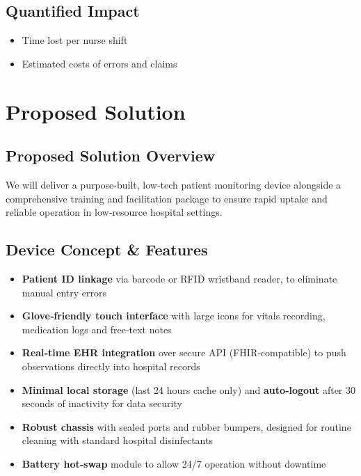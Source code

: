 \documentclass[a4paper,11pt]{article}
\begin{document}
\subsection{Quantified Impact}
\begin{itemize}
  \item Time lost per nurse shift
  \item Estimated costs of errors and claims
\end{itemize}

\section{Proposed Solution}
\subsection{Proposed Solution Overview}
We will deliver a purpose-built, low‑tech patient monitoring device alongside a comprehensive training and facilitation package to ensure rapid uptake and reliable operation in low‑resource hospital settings.

\subsection{Device Concept & Features}
\begin{itemize}
\item \textbf{Patient ID linkage} via barcode or RFID wristband reader, to eliminate manual entry errors
\item \textbf{Glove‑friendly touch interface} with large icons for vitals recording, medication logs and free‑text notes
\item \textbf{Real‑time EHR integration} over secure API (FHIR‑compatible) to push observations directly into hospital records
\item \textbf{Minimal local storage} (last 24 hours cache only) and \textbf{auto‑logout} after 30 seconds of inactivity for data security
\item \textbf{Robust chassis} with sealed ports and rubber bumpers, designed for routine cleaning with standard hospital disinfectants
\item \textbf{Battery hot‑swap} module to allow 24/7 operation without downtime
\end{itemize}
\end{document}
